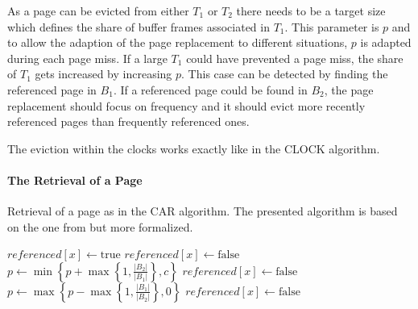 	As a page can be evicted from either $T_1$ or $T_2$ there needs to be a target size which defines the share of buffer frames associated in $T_1$. This parameter is $p$ and to allow the adaption of the page replacement to different situations, $p$ is adapted during each page miss. If a large $T_1$ could have prevented a page miss, the share of $T_1$ gets increased by increasing $p$. This case can be detected by finding the referenced page in $B_1$. If a referenced page could be found in $B_2$, the page replacement should focus on frequency and it should evict more recently referenced pages than frequently referenced ones.
	
	The eviction within the clocks works exactly like in the CLOCK algorithm.

\paragraph{The Retrieval of a Page}

\begin{@empty}
	\begin{algorithm}[ht!]
		\caption{Retrieval of a page as in the CAR algorithm. The presented algorithm is based on the one from \cite{Bansal:2004} but more formalized.}
		\label{alg:getpage}
		\begin{algorithmic}[1]
					\label{algo:hitstart}
					\State $referenced\left[x\right] \gets \text{true}$
				\Else		\label{algo:hitend}	\label{algo:missstart}
						\State {}
						 \label{algo:dirmissbegin0}
							\State {}	\label{algo:removeb1}
							\State {}	\label{algo:removeb2}
						\EndIf \label{algo:dirmissend0}
					\EndIf
						\label{algo:case0}
						\State {} \label{algo:dirmissbegin1}
						\State $referenced\left[x\right] \gets \text{false}$ \label{algo:dirmissend1} \label{algo:unset0}
						\label{algo:case1}
						\State $p \gets \min\left\{p + \max\left\{1, \frac{\left|B_2\right|}{\left|B_1\right|}\right\}, c\right\}$ \label{algo:adapt0}
						\State \Call{insert\_into}{$T_2, x$}
						\State $referenced\left[x\right] \gets \text{false}$ \label{algo:unset1}
					\Else	\label{algo:case2}
						\State $p \gets \max\left\{p - \max\left\{1, \frac{\left|B_1\right|}{\left|B_2\right|}\right\}, 0\right\}$ \label{algo:adapt1}
						\State \Call{insert\_into}{$T_2, x$}
						\State $referenced\left[x\right] \gets \text{false}$ \label{algo:unset2}
					\EndIf
				\EndIf	\label{algo:missend}
			\EndProcedure
		\end{algorithmic}
	\end{algorithm}
\end{@empty}

